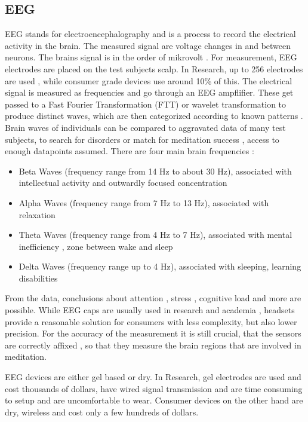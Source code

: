 \documentclass{llncs} %
\begin{document}
\subsection{EEG}
EEG stands for electroencephalography and is a process to record the electrical activity in the brain. The measured signal are voltage changes in and between neurons.
The brains signal is in the order of mikrovolt \cite{Berger}.  For measurement, EEG electrodes are placed on the test subjects scalp. In Research, up to 256 electrodes are used \cite{Seeck}, while consumer grade devices use around 10\% of this. \cite{Maskeliunas}
The electrical signal is measured as frequencies and go through an EEG ampflifier. These get passed to a Fast Fourier Transformation (FTT) or wavelet transformation \cite{Akin} to produce distinct waves, which are then categorized according to known patterns \cite{Shaker}.
Brain waves of individuals can be compared to aggravated data of many test subjects, to search for disorders \cite{Loo} or match for meditation success \cite{Tang:et al}, access to enough datapoints assumed.
There are four main brain frequencies \cite{Cahn}:
\begin{itemize}
    \item 
    Beta Waves (frequency range from 14 Hz to about 30 Hz), associated with intellectual activity and outwardly focused concentration
    \item 
    Alpha Waves (frequency range from 7 Hz to 13 Hz), associated with relaxation
    \item 
    Theta Waves (frequency range from 4 Hz to 7 Hz), associated with mental inefficiency \cite{Hammond}, zone between wake and sleep
    \item 
    Delta Waves (frequency range up to 4 Hz), associated with sleeping, learning disabilities \cite{Hammond}
\end{itemize}
From the data, conclusions about attention \cite{Berka}, stress \cite{Hosseini}, cognitive load \cite{Antonenko} and more are possible.
While EEG caps are usually used in research and academia \cite{Seeck}, headsets provide a reasonable solution for consumers with less complexity, but also lower precision\cite{Maskeliunas}.
For the accuracy of the measurement it is still crucial, that the sensors are correctly affixed \cite{Seeck}, so that they measure the brain regions that are involved in meditation.

EEG devices are either gel based or dry. In Research, gel electrodes are used and cost thousands of dollars, have wired signal transmission and are time consuming to setup and are uncomfortable to wear.
Consumer devices on the other hand are dry, wireless and cost only a few hundreds of dollars. \cite{Decho}
\end{document}
